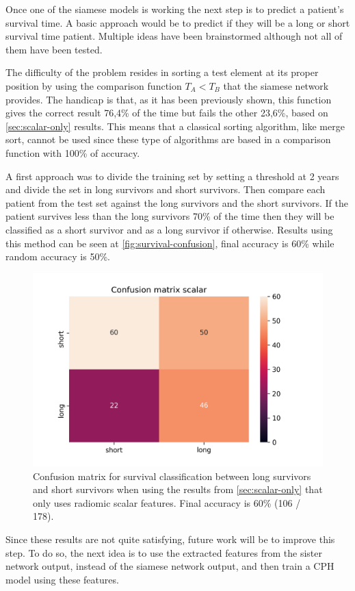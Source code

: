 
Once one of the siamese models is working the next step is to predict a patient's survival
time. A basic approach would be to predict if they will be a long or short survival time 
patient. Multiple ideas have been brainstormed although not all of them have been tested.

The difficulty of the problem resides in sorting a test element at its proper position 
by using the comparison function \( T_A < T_B \) that the siamese network provides. 
The handicap is that, as it has been previously shown, this function gives the correct 
result 76,4\% of the time but fails the other 23,6\%, based on \autoref{sec:scalar-only} 
results. This means that a classical sorting algorithm, like merge sort, cannot be 
used since these type of algorithms are based in a comparison function with 100\% of accuracy.

A first approach was to divide the training set by setting a threshold at 2 years
and divide the set in long survivors and short survivors. Then compare each patient from the
test set against the long survivors and the short survivors. If the patient survives less
than the long survivors 70\% of the time then they will be classified as a short survivor and
as a long survivor if otherwise. Results using this method can be seen at 
\autoref{fig:survival-confusion}, final accuracy is 60\% while random accuracy is 50\%.

\begin{figure}
  \centering
  \includegraphics[width=.5\textwidth]{images/results/survival_scalar}

  \caption[Confusion matrix for survival classification]{
    Confusion matrix for survival classification between long survivors and short 
    survivors when using the results from \autoref{sec:scalar-only} that only uses
    radiomic scalar features. Final accuracy is 60\% (106 / 178).
    \label{fig:survival-confusion}
  }
\end{figure}

Since these results are not quite satisfying, future work will be to improve this step.
To do so, the next idea is to use the extracted features from the sister network output,
instead of the siamese network output, and then train a \gls{CPH} model using these features.

